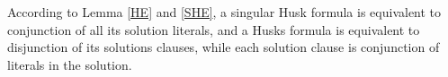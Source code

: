 \documentclass[conference]{IEEEtran}
\begin{document}
% 
%  

%         
%                 
According to Lemma \ref{HE} and \ref{SHE},
a singular Husk formula is equivalent to conjunction of all its solution literals,
and a Husks formula is equivalent to disjunction of its solutions clauses, 
while each solution clause is conjunction of literals in the solution.
\end{document}
